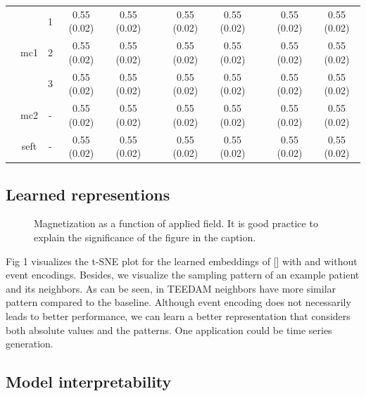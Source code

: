 \documentclass[journal,twoside,web]{ieeecolor}
\begin{document}
\begin{table}[htbp]
\begin{tabular}{ccccccccccc}
  \cmidrule{2-11}          & \multirow{3}[2]{*}{mc1} & 1     & 0.55 (0.02) & 0.55 (0.02) &       & 0.55 (0.02) & 0.55 (0.02) &       & 0.55 (0.02) & 0.55 (0.02) \\
            &       & 2     & 0.55 (0.02) & 0.55 (0.02) &       & 0.55 (0.02) & 0.55 (0.02) &       & 0.55 (0.02) & 0.55 (0.02) \\
            &       & 3     & 0.55 (0.02) & 0.55 (0.02) &       & 0.55 (0.02) & 0.55 (0.02) &       & 0.55 (0.02) & 0.55 (0.02) \\
  \cmidrule{2-11}          & mc2   & -     & 0.55 (0.02) & 0.55 (0.02) &       & 0.55 (0.02) & 0.55 (0.02) &       & 0.55 (0.02) & 0.55 (0.02) \\
            & seft  & -     & 0.55 (0.02) & 0.55 (0.02) &       & 0.55 (0.02) & 0.55 (0.02) &       & 0.55 (0.02) & 0.55 (0.02) \\
      \bottomrule
      \end{tabular}%
    \label{tab:3}%
  \end{table}%
  
  
  
  








\subsection{Learned representions}

\begin{figure}[!t]
    \centerline{}
    \caption{Magnetization as a function of applied field.
    It is good practice to explain the significance of the figure in the caption.}
    \label{fig1}
    \end{figure}

Fig 1 visualizes the t-SNE plot for the learned embeddings of [] with and without event encodings. Besides, we visualize the sampling pattern of an example patient and its neighbors. As can be seen, in TEEDAM neighbors have more similar pattern compared to the baseline. Although event encoding does not necessarily leads to better performance, we can learn a better representation that considers both absolute values and the patterns. One application could be time series generation.


\subsection{Model interpretability}
\end{document}

